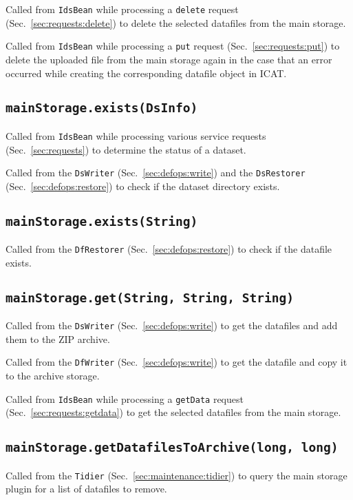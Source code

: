 \documentclass[paper=a4]{scrartcl}
\begin{document}
Called from \texttt{IdsBean} while processing a \texttt{delete}
request (Sec.~\ref{sec:requests:delete}) to delete the selected
datafiles from the main storage.

Called from \texttt{IdsBean} while processing a \texttt{put} request
(Sec.~\ref{sec:requests:put}) to delete the uploaded file from the
main storage again in the case that an error occurred while creating
the corresponding datafile object in ICAT.

\subsection{\texttt{mainStorage.exists(DsInfo)}}

Called from \texttt{IdsBean} while processing various service requests
(Sec.~\ref{sec:requests}) to determine the status of a dataset.

Called from the \texttt{DsWriter} (Sec.~\ref{sec:defops:write}) and
the \texttt{DsRestorer} (Sec.~\ref{sec:defops:restore}) to check if
the dataset directory exists.

\subsection{\texttt{mainStorage.exists(String)}}

Called from the \texttt{DfRestorer} (Sec.~\ref{sec:defops:restore})
to check if the datafile exists.

\subsection{\texttt{mainStorage.get(String, String, String)}}

Called from the \texttt{DsWriter} (Sec.~\ref{sec:defops:write}) to
get the datafiles and add them to the ZIP archive.

Called from the \texttt{DfWriter} (Sec.~\ref{sec:defops:write}) to
get the datafile and copy it to the archive storage.

Called from \texttt{IdsBean} while processing a \texttt{getData}
request (Sec.~\ref{sec:requests:getdata}) to get the selected
datafiles from the main storage.

\subsection{\texttt{mainStorage.getDatafilesToArchive(long, long)}}

Called from the \texttt{Tidier} (Sec.~\ref{sec:maintenance:tidier}) to
query the main storage plugin for a list of datafiles to remove.
\end{document}
